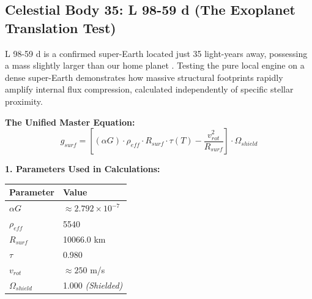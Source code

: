 \documentclass[11pt, a4paper]{article}
\begin{document}
\clearpage
\subsection{Celestial Body 35: L 98-59 d (The Exoplanet Translation Test)}
  L 98-59 d is a confirmed super-Earth located just 35 light-years away, possessing a mass slightly larger than our home planet \cite{kostov2019}. Testing the pure local engine on a dense super-Earth demonstrates how massive structural footprints rapidly amplify internal flux compression, calculated independently of specific stellar proximity.

  \vspace{0.5em}
  \noindent \textbf{The Unified Master Equation:}
  $$ g_{surf} = \left[ (\alpha G) \cdot \rho_{eff} \cdot R_{surf} \cdot \tau(T) - \frac{v_{rot}^2}{R_{surf}} \right] \cdot \Omega_{shield} $$

  \vspace{0.5em}
  \noindent \textbf{1. Parameters Used in Calculations:} \\[0.5em]
  \begingroup
  \renewcommand{\arraystretch}{1.3}
  \hspace*{2em}
  \begin{tabular}{|l|l|}
    \hline
    \textbf{Parameter} & \textbf{Value} \\ \hline
    $\alpha G$ & $\approx 2.792 \times 10^{-7}$ \\ \hline
    $\rho_{eff}$ & 5540 \\ \hline
    $R_{surf}$ & 10066.0 km \\ \hline
    $\tau$ & 0.980 \\ \hline
    $v_{rot}$ & $\approx 250$ m/s \\ \hline
    $\Omega_{shield}$ & 1.000 \textit{(Shielded)} \\ \hline
  \end{tabular}
  \endgroup
\end{document}
